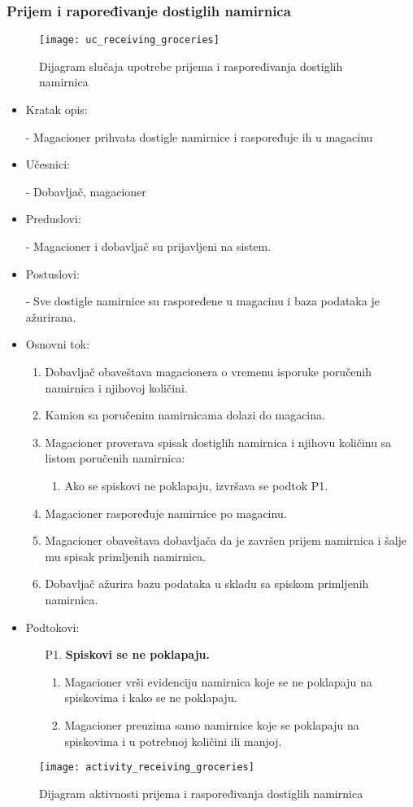 
\subsubsection{Prijem i rapoređivanje dostiglih namirnica}
\begin{figure}[H]
	\begin{center}
		\texttt{[image: uc\_receiving\_groceries]}
	\end{center}
	\caption{Dijagram slučaja upotrebe prijema i raspoređivanja dostiglih namirnica}
\end{figure}
	\begin{itemize}
		\item{Kratak opis:} 
		
		- Magacioner prihvata dostigle namirnice i raspoređuje ih u magacinu
		\item{Učesnici:} 
		
		- Dobavljač, magacioner
		\item{Preduslovi:}
		
		- Magacioner i dobavljač su prijavljeni na sistem.
		\item{Postuslovi:}
		
		- Sve dostigle namirnice su raspoređene u magacinu i baza podataka je ažurirana.
		\item{Osnovni tok:}
		\begin{enumerate}
			\item{Dobavljač obaveštava magacionera o vremenu isporuke poručenih namirnica i njihovoj količini.}
			\item{Kamion sa poručenim namirnicama dolazi do magacina.}
			\item{Magacioner proverava spisak dostiglih namirnica i njihovu količinu sa listom poručenih namirnica:}
			\begin{enumerate}
			\item{Ako se spiskovi ne poklapaju, izvršava se podtok P1.}
			\end{enumerate}
			\item{Magacioner raspoređuje namirnice po magacinu.}
			\item{Magacioner obaveštava dobavljača da je završen prijem namirnica i šalje mu spisak primljenih namirnica.}
			\item{Dobavljač ažurira bazu podataka u skladu sa spiskom primljenih namirnica.}
		\end{enumerate}
		
		\item{Podtokovi:}
			\begin{enumerate}
				\item[P1.] \textbf{Spiskovi se ne poklapaju.} 
				\begin{enumerate}
				\item{Magacioner vrši evidenciju namirnica koje se ne poklapaju na spiskovima i kako se ne poklapaju.}
				\item{Magacioner preuzima samo namirnice koje se poklapaju na spiskovima i u potrebnoj količini ili manjoj.}
				\end{enumerate}
			\end{enumerate}
	\end{itemize}
\begin{figure}[H]
	\begin{center}
		\texttt{[image: activity\_receiving\_groceries]}
		\caption{Dijagram aktivnosti prijema i raspoređivanja dostiglih namirnica}
	\end{center}
\end{figure}
